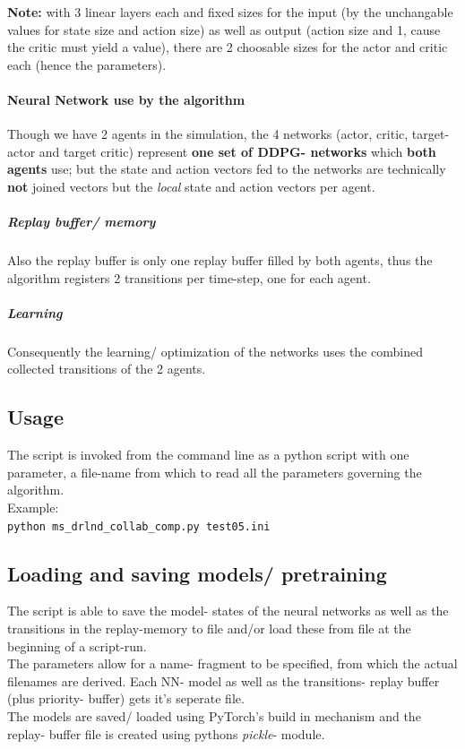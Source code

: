 \documentclass[a4paper]{article}
\begin{document}
\textbf{Note:} with 3 linear layers each and fixed sizes for the input
(by the unchangable values for state size and action size) as well as output
(action size and 1, cause the critic must yield a value), there are 2
choosable sizes for the actor and critic each (hence the parameters).

\paragraph{Neural Network use by the algorithm}
Though we have 2 agents in the simulation, the 4 networks (actor, critic,
target-actor and target critic) represent \textbf{one set of DDPG- networks}
which \textbf{both agents} use; but the state and action vectors fed to the
networks are technically \textbf{not} joined vectors but the \textit{local}
state and action vectors per agent.

\subparagraph{Replay buffer/ memory}
Also the replay buffer is only one replay buffer filled by both agents, thus
the algorithm registers 2 transitions per time-step, one for each agent.

\subparagraph{Learning}
Consequently the learning/ optimization of the networks uses the combined
collected transitions of the 2 agents. 

\subsection{Usage}
The script is invoked from the command line as a python script with one parameter,
a file-name from which to read all the parameters governing the algorithm.
\\
Example:\\
\texttt{python ms\_drlnd\_collab\_comp.py test05.ini}

\subsection{Loading and saving models/ pretraining}
The script is able to save the model- states of the neural networks as well as
the transitions in the replay-memory to file and/or load these from file
at the beginning of a script-run.
\\
The parameters allow for a name- fragment to be specified, from which the
actual filenames are derived. Each NN- model as well as the transitions-
replay buffer (plus priority- buffer) gets it's seperate file.
\\
The models are saved/ loaded using PyTorch's build in mechanism and the
replay- buffer file is created using pythons \textit{pickle}- module.
\end{document}
